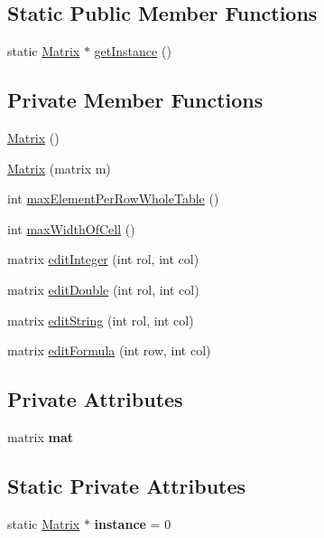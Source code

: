 \subsection*{Static Public Member Functions}
\begin{DoxyCompactItemize}
\item 
static \hyperlink{class_matrix}{Matrix} $\ast$ \hyperlink{class_matrix_a0c8e09a50ddb4d068d39456ea130abcc}{get\+Instance} ()
\end{DoxyCompactItemize}
\subsection*{Private Member Functions}
\begin{DoxyCompactItemize}
\item 
\hyperlink{class_matrix_a2dba13c45127354c9f75ef576f49269b}{Matrix} ()
\item 
\hyperlink{class_matrix_abc64f3d5a4f22323a24be2bfabf377cb}{Matrix} (matrix m)
\item 
int \hyperlink{class_matrix_a8620c5426a31cf8fe0072df32bb3f65d}{max\+Element\+Per\+Row\+Whole\+Table} ()
\item 
int \hyperlink{class_matrix_a60dac9b70e73a12d2adb32d6be9ff65d}{max\+Width\+Of\+Cell} ()
\item 
matrix \hyperlink{class_matrix_a91c66e2961a16adf56b8d58b916d2d46}{edit\+Integer} (int rol, int col)
\item 
matrix \hyperlink{class_matrix_a147d3813e96ef757fb0d5ff65e5f97ef}{edit\+Double} (int rol, int col)
\item 
matrix \hyperlink{class_matrix_a7029d8a3cd3c691b46adfd777abc880c}{edit\+String} (int rol, int col)
\item 
matrix \hyperlink{class_matrix_af3d26e46fcec1a98380b1af04f008f22}{edit\+Formula} (int row, int col)
\end{DoxyCompactItemize}
\subsection*{Private Attributes}
\begin{DoxyCompactItemize}
\item 
\mbox{\label{class_matrix_a1b0c75c45092426431308172aab92c66}} 
matrix {\bfseries mat}
\end{DoxyCompactItemize}
\subsection*{Static Private Attributes}
\begin{DoxyCompactItemize}
\item 
\mbox{\label{class_matrix_adbe13eefa6a6ea2f02f45da26400f22e}} 
static \hyperlink{class_matrix}{Matrix} $\ast$ {\bfseries instance} = 0
\end{DoxyCompactItemize}


